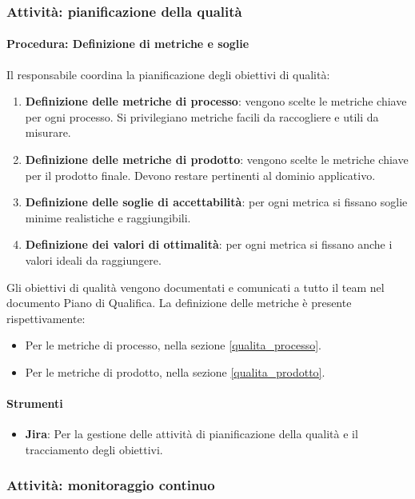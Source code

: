 \documentclass[a4paper,12pt]{article}
\begin{document}
\subsubsection{Attività: pianificazione della qualità}\label{pianificazione_qualita}

\paragraph{Procedura: Definizione di metriche e soglie}
Il responsabile coordina la pianificazione degli obiettivi di qualità:
\begin{enumerate}
    \item \textbf{Definizione delle metriche di processo}: vengono scelte le metriche chiave per ogni processo. Si privilegiano metriche facili da raccogliere e utili da misurare.
    \item \textbf{Definizione delle metriche di prodotto}: vengono scelte le metriche chiave per il prodotto finale. Devono restare pertinenti al dominio applicativo.
    \item \textbf{Definizione delle soglie di accettabilità}: per ogni metrica si fissano soglie minime realistiche e raggiungibili.
    \item \textbf{Definizione dei valori di ottimalità}: per ogni metrica si fissano anche i valori ideali da raggiungere.
\end{enumerate}

Gli obiettivi di qualità vengono documentati e comunicati a tutto il team nel documento Piano di Qualifica.
La definizione delle metriche è presente rispettivamente:
\begin{itemize}
    \item Per le metriche di processo, nella sezione \ref{qualita_processo}.
    \item Per le metriche di prodotto, nella sezione \ref{qualita_prodotto}.
\end{itemize}

\paragraph{Strumenti}
\begin{itemize}
    \item \textbf{Jira}: Per la gestione delle attività di pianificazione della qualità e il tracciamento degli obiettivi.
\end{itemize}
\subsubsection{Attività: monitoraggio continuo}\label{monitoraggio_continuo}
\end{document}
